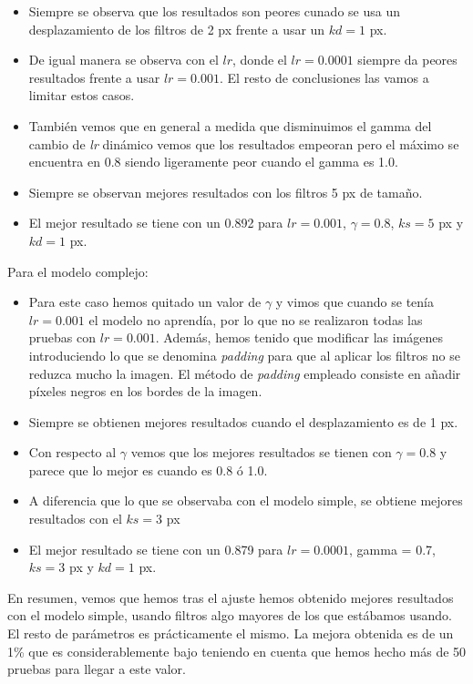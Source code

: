 \documentclass[a4paper,12pt,twoside,titlepage]{article}
\begin{document}
\begin{itemize}
  \item Siempre se observa que los resultados son peores cunado se usa un desplazamiento de los filtros de 2 px frente a usar un $kd = 1$ px.
  \item De igual manera se observa con el $lr$, donde el $lr = 0.0001$ siempre da peores resultados frente a usar $lr = 0.001$. El resto de conclusiones las vamos a limitar estos casos.
  \item También vemos que en general a medida que disminuimos el gamma del cambio de \textit{lr} dinámico vemos que los resultados empeoran pero el máximo se encuentra en 0.8 siendo ligeramente peor cuando el gamma es 1.0.
  \item Siempre se observan mejores resultados con los filtros 5 px de tamaño. 
  \item El mejor resultado se tiene con un 0.892 para $lr = 0.001$, $\gamma = 0.8$, $ks = 5$ px y $kd = 1$ px.
\end{itemize}

Para el modelo complejo:
\begin{itemize}
  \item Para este caso hemos quitado un valor de $\gamma$ y vimos que cuando se tenía $lr = 0.001$ el modelo no aprendía, por lo que no se realizaron todas las pruebas con $lr = 0.001$. Además, hemos tenido que modificar las imágenes introduciendo lo que se denomina \textit{padding} para que al aplicar los filtros no se reduzca mucho la imagen. El método de \textit{padding} empleado consiste en añadir píxeles negros en los bordes de la imagen.
  \item Siempre se obtienen mejores resultados cuando el desplazamiento es de 1 px.
  \item Con respecto al $\gamma$ vemos que los mejores resultados se tienen con $\gamma = 0.8$ y parece que lo mejor es cuando es 0.8 ó 1.0.
  \item A diferencia que lo que se observaba con el modelo simple, se obtiene mejores resultados con el $ks = 3$ px
  \item El mejor resultado se tiene con un 0.879 para $lr = 0.0001$, gamma = 0.7, $ks = 3$ px y $kd = 1$ px.
\end{itemize}

En resumen, vemos que hemos tras el ajuste hemos obtenido mejores resultados con el modelo simple, usando filtros algo mayores de los que estábamos usando. El resto de parámetros es prácticamente el mismo. La mejora obtenida es de un 1\% que es considerablemente bajo teniendo en cuenta que hemos hecho más de 50 pruebas para llegar a este valor.
\end{document}
